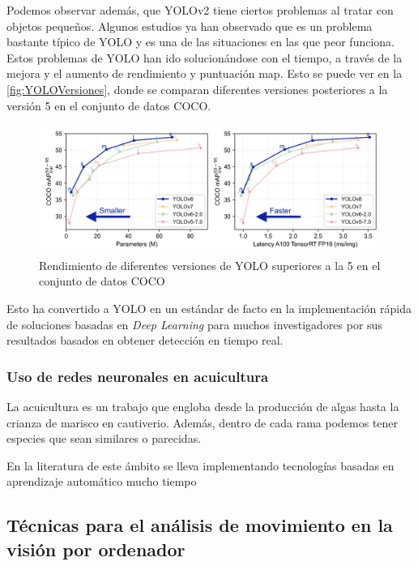Podemos observar además, que YOLOv2 tiene ciertos problemas al tratar con objetos pequeños. Algunos estudios\cite{bhagyaOverviewDeepLearning2019} ya han observado que es un problema bastante típico de YOLO y es una de las situaciones en las que 
peor funciona.\newline
Estos problemas de YOLO han ido solucionándose con el tiempo, a través de la mejora y el aumento de rendimiento y puntuación \acrshort{map}. Esto se puede ver en la \autoref{fig:YOLOVersiones}, donde se 
comparan diferentes versiones posteriores a la versión 5 en el conjunto de datos COCO.

\begin{figure}[H]
    \centering
    \includegraphics[width=1\textwidth]{images/4/YOLOVersiones.png}
    \caption{Rendimiento de diferentes versiones de YOLO superiores a la 5 en el conjunto de datos COCO\cite{ultralyticsYOLOv8}}
    \label{fig:YOLOVersiones}
\end{figure}

Esto ha convertido a YOLO en un estándar de facto en la implementación rápida de soluciones basadas en \textit{Deep Learning} para muchos investigadores por sus resultados basados en obtener detección en tiempo real.

\clearpage

\subsubsection{Uso de redes neuronales en acuicultura}

La acuicultura es un trabajo que engloba desde la producción de algas hasta la crianza de marisco en cautiverio. Además, dentro de cada rama podemos tener especies que sean similares o parecidas.

En la literatura de este ámbito se lleva implementando tecnologías basadas en aprendizaje automático mucho tiempo



\subsection{Técnicas para el análisis  de movimiento en la visión por ordenador}

